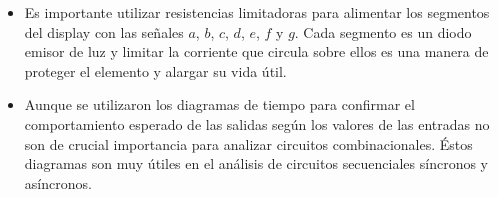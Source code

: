 \begin{itemize}
	\item Es importante utilizar resistencias limitadoras para alimentar los segmentos del display con las señales $a$, $b$, $c$, $d$, $e$, $f$ y $g$. Cada segmento es un diodo emisor de luz y limitar la corriente que circula sobre ellos es una manera de proteger el elemento y alargar su vida útil.
	
	\item Aunque se utilizaron los diagramas de tiempo para confirmar el comportamiento esperado de las salidas según los valores de las entradas no son de crucial importancia para analizar circuitos combinacionales. Éstos diagramas son muy útiles en el análisis de circuitos secuenciales síncronos y asíncronos.
	
\end{itemize}